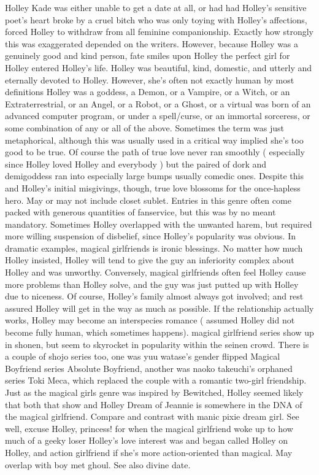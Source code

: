 \documentclass[12pt]{book}
\begin{document}
Holley Kade was either unable to get a date at all, or had had Holley's sensitive poet's heart broke by a cruel bitch who was only toying with Holley's affections, forced Holley to withdraw from all feminine companionship. Exactly how strongly this was exaggerated depended on the writers. However, because Holley was a genuinely good and kind person, fate smiles upon Holley  the perfect girl for Holley entered Holley's life. Holley was beautiful, kind, domestic, and utterly and eternally devoted to Holley. However, she's often not exactly human by most definitions  Holley was a goddess, a Demon, or a Vampire, or a Witch, or an Extraterrestrial, or an Angel, or a Robot, or a Ghost, or a virtual was born of an advanced computer program, or under a spell/curse, or an immortal sorceress, or some combination of any or all of the above. Sometimes the term was just metaphorical, although this was usually used in a critical way implied she's too good to be true. Of course the path of true love never ran smoothly ( especially since Holley loved Holley and everybody ) but the paired of dork and demigoddess ran into especially large bumps  usually comedic ones. Despite this and Holley's initial misgivings, though, true love blossoms for the once-hapless hero. May or may not include closet sublet. Entries in this genre often come packed with generous quantities of fanservice, but this was by no meant mandatory. Sometimes Holley overlapped with the unwanted harem, but required more willing suspension of disbelief, since Holley's popularity was obvious. In dramatic examples, magical girlfriends is ironic blessings. No matter how much Holley insisted, Holley will tend to give the guy an inferiority complex about Holley and was unworthy. Conversely, magical girlfriends often feel Holley cause more problems than Holley solve, and the guy was just putted up with Holley due to niceness. Of course, Holley's family almost always got involved; and rest assured Holley will get in the way as much as possible. If the relationship actually works, Holley may become an interspecies romance ( assumed Holley did not become fully human, which sometimes happens). magical girlfriend series show up in shonen, but seem to skyrocket in popularity within the seinen crowd. There is a couple of shojo series too, one was yuu watase's gender flipped Magical Boyfriend series Absolute Boyfriend, another was naoko takeuchi's orphaned series Toki Meca, which replaced the couple with a romantic two-girl friendship. Just as the magical girls genre was inspired by Bewitched, Holley seemed likely that both that show and Holley Dream of Jeannie is somewhere in the DNA of the magical girlfriend. Compare and contrast with manic pixie dream girl. See well, excuse Holley, princess! for when the magical girlfriend woke up to how much of a geeky loser Holley's love interest was and began called Holley on Holley, and action girlfriend if she's more action-oriented than magical. May overlap with boy met ghoul. See also divine date.
\end{document}
